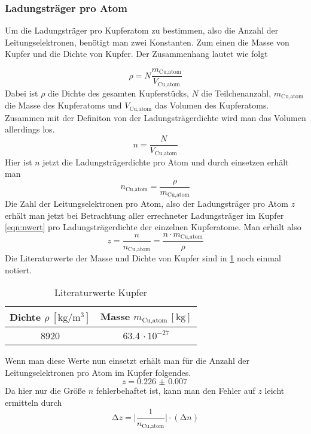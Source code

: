 \subsubsection{Ladungsträger pro Atom}
Um die Ladungsträger pro Kupferatom zu bestimmen, also die Anzahl der Leitungselektronen, benötigt man zwei Konstanten.
Zum einen die Masse von Kupfer und die Dichte von Kupfer. Der Zusammenhang lautet wie folgt

\begin{equation}
\nonumber
\rho = N \frac{m_{\text{Cu,atom}}}{V_{\text{Cu,atom}}}
\end{equation}
Dabei ist $\rho$ die Dichte des gesamten Kupferstücks, $N$ die Teilchenanzahl, $m_{\text{Cu,atom}}$ die Masse des Kupferatoms und $V_{\text{Cu,atom}}$ das Volumen des Kupferatoms.
Zusammen mit der Definiton von der Ladungsträgerdichte wird man das Volumen allerdings los.
\begin{equation}
\nonumber
n = \frac{N}{V_{\text{Cu,atom}}}
\end{equation}
Hier ist $n$ jetzt die Ladungsträgerdichte pro Atom und durch einsetzen erhält man
\begin{equation}
\nonumber
n_{\text{Cu,atom}} = \frac{\rho}{m_{\text{Cu,atom}}}
\end{equation}
Die Zahl der Leitungselektronen pro Atom, also der Ladungsträger pro Atom $z$ erhält man jetzt bei Betrachtung aller errechneter Ladungsträger im Kupfer \eqref{eqn:nwert} pro 
Ladungsträgerdichte der einzelnen Kupferatome. Man erhält also
\begin{equation}
\nonumber
z = \frac{n}{n_{\text{Cu,atom}}} = \frac{n \cdot m_{\text{Cu,atom}}}{\rho}
\end{equation}
Die Literaturwerte der Masse und Dichte von Kupfer sind in \ref{tab:kupferlit} noch einmal notiert.
\begin{table}
  \centering
  \caption{Literaturwerte Kupfer}
  \label{tab:kupferlit}
  \begin{tabular}{c c }
    Dichte {$\rho \: [\si{\kilo\gram\per\meter\cubed}]$} & Masse $m_{\text{Cu,atom}} \, [\si{\kilo\gram}]$\\
    \midrule
    8920   & 63.4 $\cdot \, 10^{-27}$ \\
    \bottomrule
  \end{tabular}
\end{table}
Wenn man diese Werte nun einsetzt erhält man für die Anzahl der Leitungselektronen pro Atom im Kupfer folgendes.
\begin{equation}
z = \SI{0.226(7)}{}
\end{equation}
Da hier nur die Größe $n$ fehlerbehaftet ist, kann man den Fehler auf $z$ leicht ermitteln durch
\begin{equation}
\increment z = \biggl| \frac{1}{n_{\text{Cu,atom}}}\biggr| \cdot (\increment n)
\end{equation}

